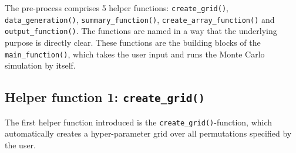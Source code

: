 \documentclass[11pt,a4paper]{article}
\begin{document}
The pre-process comprises 5 helper functions: \texttt{create\_grid()},
\texttt{data\_generation()}, \texttt{summary\_function()},
\texttt{create\_array\_function()} and \texttt{output\_function()}. The
functions are named in a way that the underlying purpose is directly
clear. These functions are the building blocks of the
\texttt{main\_function()}, which takes the user input and runs the Monte
Carlo simulation by itself.

\hypertarget{helper-function-1-create_grid}{%
\subsection{\texorpdfstring{Helper function 1:
\texttt{create\_grid()}}{Helper function 1: create\_grid()}}\label{helper-function-1-create_grid}}

The first helper function introduced is the
\texttt{create\_grid()}-function, which automatically creates a
hyper-parameter grid over all permutations specified by the user.
\end{document}
